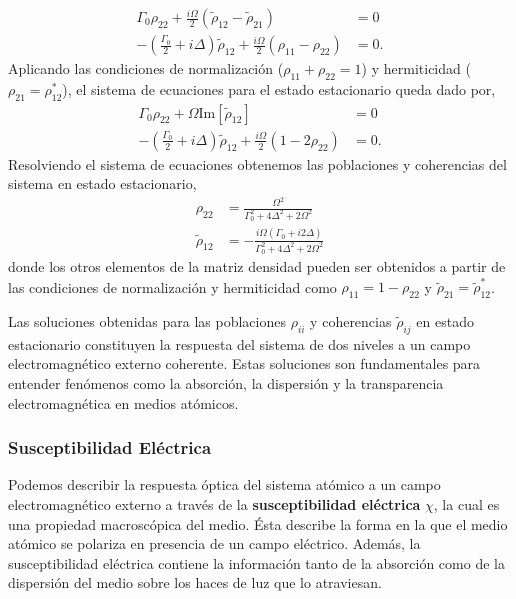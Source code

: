 \begin{equation}
\begin{split}
    \Gamma_0 \rho_{22} + \frac{i \Omega}{2}(\tilde{\rho}_{12} - \tilde{\rho}_{21}) &= 0 \\
    -(\frac{\Gamma_0}{2} + i \Delta) \tilde{\rho}_{12} + \frac{i \Omega}{2}(\rho_{11} - \rho_{22}) &= 0.
\end{split}
\end{equation}
Aplicando las condiciones de normalización ($\rho_{11} + \rho_{22} = 1$) y hermiticidad ($\rho_{21} = \rho_{12}^{*}$), el sistema de ecuaciones para el estado estacionario queda dado por,
\begin{equation}
\begin{split}
    \Gamma_0 \rho_{22} + \Omega \text{Im}[\tilde{\rho}_{12}] &= 0 \\
    -(\frac{\Gamma_0}{2} + i \Delta) \tilde{\rho}_{12} + \frac{i \Omega}{2}(1 - 2\rho_{22}) &= 0.
\end{split}
\end{equation}
Resolviendo el sistema de ecuaciones obtenemos las poblaciones y coherencias del sistema en estado estacionario,
\begin{equation}
\begin{split}
    \rho_{22} &= \frac{\Omega^2}{\Gamma_0^2 + 4 \Delta^2 + 2 \Omega^2  } \\
    \tilde{\rho}_{12} &= -\frac{i \Omega (\Gamma_0 + i 2 \Delta)}{\Gamma_0^2 + 4 \Delta^2 + 2 \Omega^2 }
\end{split}
\end{equation}
donde los otros elementos de la matriz densidad pueden ser obtenidos a partir de las condiciones de normalización y hermiticidad como $\rho_{11} = 1 - \rho_{22}$ y $\tilde{\rho}_{21} = \tilde{\rho}_{12}^*$.

Las soluciones obtenidas para las poblaciones $\rho_{ii}$ y coherencias $\tilde{\rho}_{ij}$ en estado estacionario constituyen la respuesta del sistema de dos niveles a un campo electromagnético externo coherente. Estas soluciones son fundamentales para entender fenómenos como la absorción, la dispersión y la transparencia electromagnética en medios atómicos.

\subsubsection{Susceptibilidad Eléctrica}
Podemos describir la respuesta óptica del sistema atómico a un campo electromagnético externo a través de la \textbf{susceptibilidad eléctrica} $\chi$, la cual es una propiedad macroscópica del medio. Ésta describe la forma en la que el medio atómico se polariza en presencia de un campo eléctrico. Además, la susceptibilidad eléctrica contiene la información tanto de la absorción como de la dispersión del medio sobre los haces de luz que lo atraviesan.

